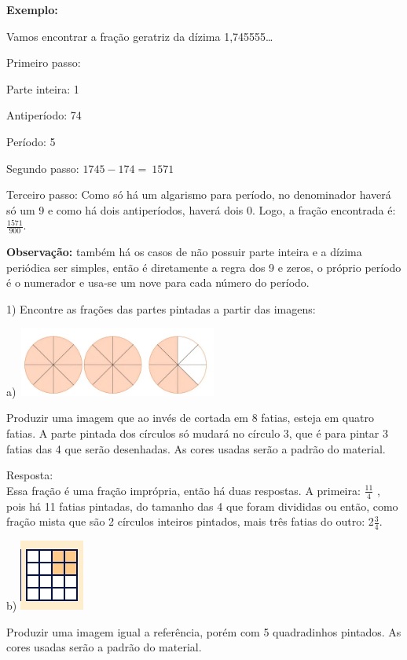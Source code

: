 \textbf{Exemplo:}

Vamos encontrar a fração geratriz da dízima 1,745555\ldots{}

Primeiro passo:

Parte inteira: 1

Antiperíodo: 74

Período: 5

Segundo passo: \(1745 - 174 = \ 1571\)

Terceiro passo: Como só há um algarismo para período, no denominador
haverá só um 9 e como há dois antiperíodos, haverá dois 0. Logo, a
fração encontrada é: \(\frac{1571}{900}.\)

\textbf{Observação:} também há os casos de não possuir parte inteira e a
dízima periódica ser simples, então é diretamente a regra dos 9 e zeros,
o próprio período é o numerador e usa-se um nove para cada número do
período.


1) Encontre as frações das partes pintadas a partir das imagens:

a)
\includegraphics[width=2.59149in,height=0.89856in]{./imgSAEB_7_MAT/media/image7.png}

Produzir uma imagem que ao invés de cortada em 8 fatias, esteja em
quatro fatias. A parte pintada dos círculos só mudará no círculo 3, que
é para pintar 3 fatias das 4 que serão desenhadas. As cores usadas serão
a padrão do material.

Resposta:\\
Essa fração é uma fração imprópria, então há duas respostas. A primeira:
\(\frac{11}{4}\) , pois há 11 fatias pintadas, do tamanho das 4 que
foram divididas ou então, como fração mista que são 2 círculos inteiros
pintados, mais três fatias do outro: 2\(\frac{3}{4}\).

b)
\includegraphics[width=0.83333in,height=0.91667in]{./imgSAEB_7_MAT/media/image8.png}

Produzir uma imagem igual a referência, porém com 5 quadradinhos
pintados. As cores usadas serão a padrão do material.

